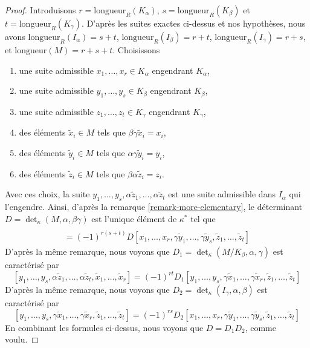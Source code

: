 \begin{proof}
\medskip\noindent
Introduisons $r = \text{longueur}_R(K_\alpha)$,
$s = \text{longueur}_R(K_\beta)$ et $t = \text{longueur}_R(K_\gamma)$.
D'après les suites exactes ci-dessus et nos hypothèses, nous avons
$\text{longueur}_R(I_\alpha) = s + t$, $\text{longueur}_R(I_\beta) = r + t$,
$\text{longueur}_R(I_\gamma) = r + s$, et
$\text{longueur}(M) = r + s + t$.
Choisissons
\begin{enumerate}
\item une suite admissible $x_1, \ldots, x_r \in K_\alpha$
engendrant $K_\alpha$,
\item une suite admissible $y_1, \ldots, y_s \in K_\beta$
engendrant $K_\beta$,
\item une suite admissible $z_1, \ldots, z_t \in K_\gamma$
engendrant $K_\gamma$,
\item des éléments $\tilde x_i \in M$ tels que $\beta\gamma\tilde x_i = x_i$,
\item des éléments $\tilde y_i \in M$ tels que $\alpha\gamma\tilde y_i = y_i$,
\item des éléments $\tilde z_i \in M$ tels que $\beta\alpha\tilde z_i = z_i$.
\end{enumerate}
Avec ces choix, la suite
$y_1, \ldots, y_s, \alpha\tilde z_1, \ldots, \alpha\tilde z_t$
est une suite admissible dans $I_\alpha$ qui l'engendre.
Ainsi, d'après la remarque \ref{remark-more-elementary}, le déterminant
$D = \det_\kappa(M, \alpha, \beta\gamma)$ est
l'unique élément de $\kappa^*$ tel que
\begin{align*}
[y_1, \ldots, y_s,
\alpha\tilde z_1, \ldots, \alpha\tilde z_s,
\tilde x_1, \ldots, \tilde x_r] \\
= (-1)^{r(s + t)} D
[x_1, \ldots, x_r,
\gamma\tilde y_1, \ldots, \gamma\tilde y_s,
\tilde z_1, \ldots, \tilde z_t]
\end{align*}
D'après la même remarque, nous voyons que
$D_1 = \det_\kappa(M/K_\beta, \alpha, \gamma)$
est caractérisé par
$$
[y_1, \ldots, y_s,
\alpha\tilde z_1, \ldots, \alpha\tilde z_t,
\tilde x_1, \ldots, \tilde x_r]
=
(-1)^{rt} D_1
[y_1, \ldots, y_s,
\gamma\tilde x_1, \ldots, \gamma\tilde x_r,
\tilde z_1, \ldots, \tilde z_t]
$$
D'après la même remarque, nous voyons que
$D_2 = \det_\kappa(I_\gamma, \alpha, \beta)$ est caractérisé par
$$
[y_1, \ldots, y_s,
\gamma\tilde x_1, \ldots, \gamma\tilde x_r,
\tilde z_1, \ldots, \tilde z_t]
=
(-1)^{rs} D_2
[x_1, \ldots, x_r,
\gamma\tilde y_1, \ldots, \gamma\tilde y_s,
\tilde z_1, \ldots, \tilde z_t]
$$
En combinant les formules ci-dessus, nous voyons que $D = D_1 D_2$,
comme voulu.
\end{proof}


